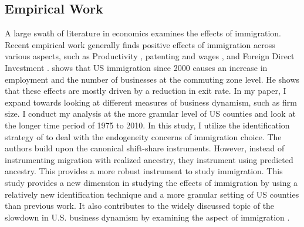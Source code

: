 \subsection{Empirical Work}

    A large swath of literature in economics examines the effects of immigration. Recent empirical work generally finds positive effects of immigration across various aspects, such as Productivity \citep{EffectofImmigrationProductivity}, patenting and wages \citep{ImmigrationInnovationGrowth}, and  Foreign Direct Investment \citep{MigrantsAncestorsandInvestments}. \cite{ImmigrationAndBusinessDynamics} shows that US immigration since 2000 causes an increase in employment and the number of businesses at the commuting zone level. He shows that these effects are mostly driven by a reduction in exit rate. In my paper, I expand towards looking at different measures of business dynamism, such as firm size. I conduct my analysis at the more granular level of US counties and look at the longer time period of 1975 to 2010.  In this study, I utilize the identification strategy of \cite{ImmigrationInnovationGrowth} to deal with the endogeneity concerns of immigration choice. The authors build upon the canonical \cite{CardShiftShare} shift-share instruments. However, instead of instrumenting migration with realized ancestry, they instrument using predicted ancestry. This provides a more robust instrument to study immigration. This study provides a new dimension in studying the effects of immigration by using a relatively new identification technique and a more granular setting of US counties than previous work. It also contributes to the widely discussed topic of the slowdown in U.S. business dynamism by examining the aspect of immigration \citep{TenFactsOnDecliningBusinessDynamism, AreIdeasGettingHarderToFind, bessen2016, andrews2016, PopulationGrowthFirmDynamics, FromPopulationGrowthtoFirmDemographics}. 
    
    
    